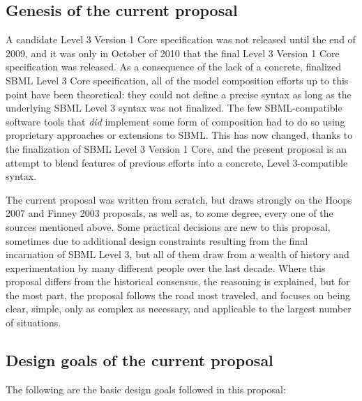 \subsection{Genesis of the current proposal}

A candidate Level 3 Version 1 Core specification was not released until
the end of 2009, and it was only in October of 2010 that the final Level
3 Version 1 Core specification was released.  As a consequence of the
lack of a concrete, finalized SBML Level 3 Core specification, all of
the model composition efforts up to this point have been theoretical:
they could not define a precise syntax as long as the underlying SBML
Level 3 syntax was not finalized.  The few SBML-compatible software
tools that \emph{did} implement some form of composition had to do so
using proprietary approaches or extensions to SBML. This has now
changed, thanks to the finalization of SBML Level 3 Version 1 Core, and
the present proposal is an attempt to blend features of previous efforts
into a concrete, Level 3-compatible syntax.

The current proposal was written from scratch, but draws strongly on the
Hoops 2007 and Finney 2003 proposals, as well as, to some degree, every
one of the sources mentioned above.  Some practical decisions are new to
this proposal, sometimes due to additional design constraints resulting
from the final incarnation of SBML Level 3, but all of them draw from a
wealth of history and experimentation by many different people over the
last decade.  Where this proposal differs from the historical consensus,
the reasoning is explained, but for the most part, the proposal follows
the road most traveled, and focuses on being clear, simple, only as
complex as necessary, and applicable to the largest number of
situations.


\subsection{Design goals of the current proposal}

The following are the basic design goals followed in this proposal:

